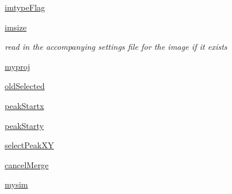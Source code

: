 \begin{DoxyCompactItemize}
\item 
\hyperlink{class_atrex_1_1_atrex_ac181165f963c93be5b4a5e79ac9100e2}{imtype\-Flag}
\item 
\hyperlink{class_atrex_1_1_atrex_aaad2acdd3e1ed0343b2414934ce8c257}{imsize}
\begin{DoxyCompactList}\small\item\em read in the accompanying settings file for the image if it exists \end{DoxyCompactList}\item 
\hyperlink{class_atrex_1_1_atrex_a46922869bb36221d04b4723afc6ceded}{myproj}
\item 
\hyperlink{class_atrex_1_1_atrex_a5a00bf83d75cef3dc64f66b7972128ac}{old\-Selected}
\item 
\hyperlink{class_atrex_1_1_atrex_a9db3f47f57f62dedb23235d73c5b81c7}{peak\-Startx}
\item 
\hyperlink{class_atrex_1_1_atrex_a7128a7471ca115d494fb8457397cb3b4}{peak\-Starty}
\item 
\hyperlink{class_atrex_1_1_atrex_a9ddce163f1008e4421d95874f8a7e006}{select\-Peak\-X\-Y}
\item 
\hyperlink{class_atrex_1_1_atrex_a5034cf92d78b203761c82c2d09571fe7}{cancel\-Merge}
\item 
\hyperlink{class_atrex_1_1_atrex_ac308bffb51e8c4a11b2adbbaf85e38ec}{mysim}
\end{DoxyCompactItemize}
